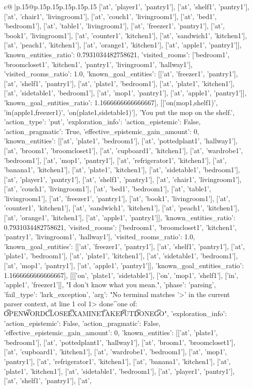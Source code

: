 \documentclass{article}
\begin{document}
{\begin{supertabular}{c@{$\;$}|p{.15\linewidth}@{}p{.15\linewidth}p{.15\linewidth}p{.15\linewidth}p{.15\linewidth}p{.15\linewidth}}
{{{['at', 'player1', 'pantry1'], ['at', 'shelf1', 'pantry1'], ['at', 'chair1', 'livingroom1'], ['at', 'couch1', 'livingroom1'], ['at', 'bed1', 'bedroom1'], ['at', 'table1', 'livingroom1'], ['at', 'freezer1', 'pantry1'], ['at', 'book1', 'livingroom1'], ['at', 'counter1', 'kitchen1'], ['at', 'sandwich1', 'kitchen1'], ['at', 'peach1', 'kitchen1'], ['at', 'orange1', 'kitchen1'], ['at', 'apple1', 'pantry1']], 'known_entities_ratio': 0.7931034482758621, 'visited_rooms': ['bedroom1', 'broomcloset1', 'kitchen1', 'pantry1', 'livingroom1', 'hallway1'], 'visited_rooms_ratio': 1.0, 'known_goal_entities': [['at', 'freezer1', 'pantry1'], ['at', 'shelf1', 'pantry1'], ['at', 'plate1', 'bedroom1'], ['at', 'plate1', 'kitchen1'], ['at', 'sidetable1', 'bedroom1'], ['at', 'mop1', 'pantry1'], ['at', 'apple1', 'pantry1']], 'known_goal_entities_ratio': 1.1666666666666667}}], [['on(mop1,shelf1)', 'in(apple1,freezer1)', 'on(plate1,sidetable1)'], 'You put the mop on the shelf.', {'action_type': 'put', 'exploration_info': {'action_epistemic': False, 'action_pragmatic': True, 'effective_epistemic_gain_amount': 0, 'known_entities': [['at', 'plate1', 'bedroom1'], ['at', 'pottedplant1', 'hallway1'], ['at', 'broom1', 'broomcloset1'], ['at', 'cupboard1', 'kitchen1'], ['at', 'wardrobe1', 'bedroom1'], ['at', 'mop1', 'pantry1'], ['at', 'refrigerator1', 'kitchen1'], ['at', 'banana1', 'kitchen1'], ['at', 'plate1', 'kitchen1'], ['at', 'sidetable1', 'bedroom1'], ['at', 'player1', 'pantry1'], ['at', 'shelf1', 'pantry1'], ['at', 'chair1', 'livingroom1'], ['at', 'couch1', 'livingroom1'], ['at', 'bed1', 'bedroom1'], ['at', 'table1', 'livingroom1'], ['at', 'freezer1', 'pantry1'], ['at', 'book1', 'livingroom1'], ['at', 'counter1', 'kitchen1'], ['at', 'sandwich1', 'kitchen1'], ['at', 'peach1', 'kitchen1'], ['at', 'orange1', 'kitchen1'], ['at', 'apple1', 'pantry1']], 'known_entities_ratio': 0.7931034482758621, 'visited_rooms': ['bedroom1', 'broomcloset1', 'kitchen1', 'pantry1', 'livingroom1', 'hallway1'], 'visited_rooms_ratio': 1.0, 'known_goal_entities': [['at', 'freezer1', 'pantry1'], ['at', 'shelf1', 'pantry1'], ['at', 'plate1', 'bedroom1'], ['at', 'plate1', 'kitchen1'], ['at', 'sidetable1', 'bedroom1'], ['at', 'mop1', 'pantry1'], ['at', 'apple1', 'pantry1']], 'known_goal_entities_ratio': 1.1666666666666667}}], [[['on', 'plate1', 'sidetable1'], ['on', 'mop1', 'shelf1'], ['in', 'apple1', 'freezer1']], "I don't know what you mean.", {'phase': 'parsing', 'fail_type': 'lark_exception', 'arg': "No terminal matches '>' in the current parser context, at line 1 col 1\n\n> done\n^\nExpected one of: \n\t* OPEN\n\t* WORD\n\t* CLOSE\n\t* EXAMINE\n\t* TAKE\n\t* PUT\n\t* DONE\n\t* GO\n", 'exploration_info': {'action_epistemic': False, 'action_pragmatic': False, 'effective_epistemic_gain_amount': 0, 'known_entities': [['at', 'plate1', 'bedroom1'], ['at', 'pottedplant1', 'hallway1'], ['at', 'broom1', 'broomcloset1'], ['at', 'cupboard1', 'kitchen1'], ['at', 'wardrobe1', 'bedroom1'], ['at', 'mop1', 'pantry1'], ['at', 'refrigerator1', 'kitchen1'], ['at', 'banana1', 'kitchen1'], ['at', 'plate1', 'kitchen1'], ['at', 'sidetable1', 'bedroom1'], ['at', 'player1', 'pantry1'], ['at', 'shelf1', 'pantry1'], ['at', }}}
\end{supertabular}}
\end{document}
